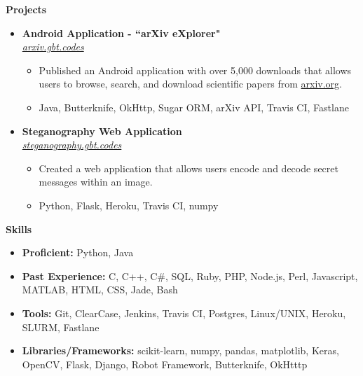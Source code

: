 \documentclass[letterpaper,10pt]{article}
\newcommand{\resitem}[1]{\item #1 \vspace{-2pt}}
\newcommand{\resheading}[1]{{\large \colorbox{mygrey}{\begin{minipage}{\textwidth}{\textbf{#1 \vphantom{p\^{E}}}}\end{minipage}}}}
\newcommand{\ressubheading}[4]{%
  \item\textbf{#1} \hfill #2\null\\
  \textit{#3} \hfill \textit{#4}%
  \vspace{-5pt}
}%
\begin{document}
\resheading{Projects}
\begin{itemize}

\ressubheading{Android Application - ``arXiv eXplorer"}{}{\href{http://arxiv.gbt.codes}{arxiv.gbt.codes}}{}
	\begin{itemize}
		\resitem{Published an Android application with over 5,000 downloads that allows users to browse, search, and download scientific papers from \href{http://arxiv.org}{arxiv.org}.}
		\resitem{Java, Butterknife, OkHttp, Sugar ORM, arXiv API, Travis CI, Fastlane}
	\end{itemize}
	

\ressubheading{Steganography Web Application}{}{\href{http://steganography.gbt.codes}{steganography.gbt.codes}}{}
	\begin{itemize}
		\resitem{Created a web application that allows users encode and decode secret messages within an image.}
		\resitem{Python, Flask, Heroku, Travis CI, numpy}
	\end{itemize}




\end{itemize}

\resheading{Skills}
	\begin{itemize}
	\resitem{\textbf{Proficient:} Python, Java}
	\resitem{\textbf{Past Experience:} C, C++, C\#, SQL, Ruby, PHP, Node.js, Perl, Javascript, MATLAB, HTML, CSS, Jade, Bash}
	\resitem{\textbf{Tools:} Git, ClearCase, Jenkins, Travis CI, Postgres, Linux/UNIX, Heroku, SLURM, Fastlane}
	\resitem{\textbf{Libraries/Frameworks:} scikit-learn, numpy, pandas, matplotlib, Keras, OpenCV, Flask, Django, Robot Framework, Butterknife, OkHtttp}
	\end{itemize}
\end{document}
